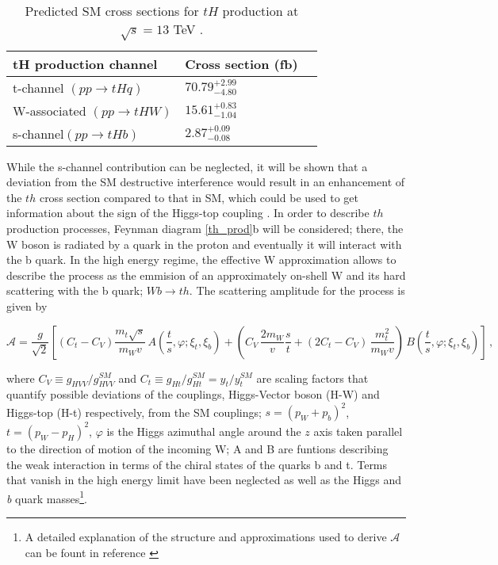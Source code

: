 \begin{center}
\begin{table}[h]
\centering
\begin{tabular}{lll}\hline
tH production channel       & Cross section (fb)      \\\hline
t-channel $(pp \to tHq)$    & $70.79^{+2.99}_{-4.80}$ \\
W-associated $(pp \to tHW)$ & $15.61^{+0.83}_{-1.04}$ \\
s-channel$(pp \to tHb)$     & $ 2.87^{+0.09}_{-0.08}$ \\\hline
\end{tabular}
\caption[Predicted SM cross sections for tH production at $\sqrt{s}=13$ TeV.]{Predicted SM cross sections for $tH$ production at $\sqrt{s}=13$ TeV \cite{thqw_xsec, thb_xsec}.}\label{tab:th_xsec}
\end{table}
\end{center}

\noindent While the s-channel contribution can be neglected, it will be shown that a deviation from the SM destructive interference would result in an enhancement of the $th$ cross section compared to that in SM, which could be used to get information about the sign of the Higgs-top coupling \cite{farina,tait}. In order to describe $th$ production processes, Feynman diagram \ref{th_prod}b will be considered; there, the W boson is radiated by a quark in the proton and eventually it will interact with the b quark. In the high energy regime, the effective W approximation\cite{dawson} allows to describe the process as the emmision of an approximately on-shell W and its hard scattering with the b quark; \ie $Wb \to th$. The scattering amplitude for the process is given by

\begin{equation} \label{s_amp}
\mathcal{A}= \frac{g}{\sqrt{2}}\left[(C_{t}-C_{V})\frac{m_{t}\sqrt{s}}{m_{W}v}\,A\left(\frac{t}{s},\varphi; \xi_{t},\xi_{b}\right)+\left(C_{V}\,\frac{2m_{W}}{v}\frac{s}{t}+(2C_{t}-C_{V})\,\frac{m_{t}^{2}}{m_{W}v}\right)\,B\left(\frac{t}{s},\varphi; \xi_{t},\xi_{b}\right)\right]\,,
\end{equation}

\noindent where $C_{V}\equiv g_{HVV}/g_{HVV}^{SM}$ and $C_{t}\equiv g_{Ht}/g_{Ht}^{SM}=y_t/y_t^{SM}$ are scaling factors that quantify possible deviations of the couplings, Higgs-Vector boson (H-W) and Higgs-top (H-t) respectively, from the SM couplings; $s=(p_{W}+p_{b})^{2}$, $t=(p_{W}-p_{H})^{2}$, $\varphi$ is the Higgs azimuthal angle around the $z$ axis taken parallel to the direction of motion of the incoming W; A and B are funtions describing the weak interaction in terms of the chiral states of the quarks b and t. Terms that vanish in the high energy limit have been neglected as well as the Higgs and \textit{b} quark masses\footnote{A detailed explanation of the structure and approximations used to derive $\mathcal{A}$ can be fount in reference \cite{farina}}.        

